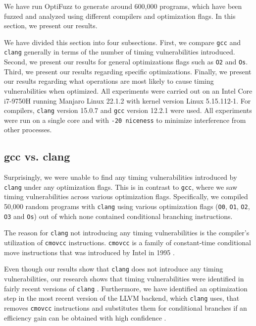 We have run OptiFuzz to generate around 600,000 programs, which have been fuzzed and analyzed using different compilers and optimization flags.
In this section, we present our results.

We have divided this section into four subsections.
First, we compare \texttt{gcc} and \texttt{clang} generally in terms of the number of timing vulnerabilities introduced.
Second, we present our results for general optimizations flags such as \texttt{O2} and \texttt{Os}.
Third, we present our results regarding specific optimizations.
Finally, we present our results regarding what operations are most likely to cause timing vulnerabilities when optimized.
All experiments were carried out on an Intel Core i7-9750H running Manjaro Linux 22.1.2 with kernel version Linux 5.15.112-1. 
For compilers, \texttt{clang} version 15.0.7 and \texttt{gcc} version 12.2.1 were used.
All experiments were run on a single core and with \texttt{-20 niceness} to minimize interference from other processes.

\subsection{gcc vs. clang}
\label{sec:gcc-vs-clang}
Surprisingly, we were unable to find any timing vulnerabilities introduced by \texttt{clang} under any optimization flags.
This is in contrast to \texttt{gcc}, where we saw timing vulnerabilities across various optimization flags.
Specifically, we compiled 50,000 random programs with \texttt{clang} using various optimization flags (\texttt{O0}, \texttt{O1}, \texttt{O2}, \texttt{O3} and \texttt{Os}) out of which none contained conditional branching instructions.

The reason for \texttt{clang} not introducing any timing vulnerabilities is the compiler's utilization of \texttt{cmovcc} instructions. 
\texttt{cmovcc} is a family of constant-time conditional move instructions \citep{cmov-is-constant-time} that was introduced by Intel in 1995 \citep{cmov-from-1995}. 

Even though our results show that \texttt{clang} does not introduce any timing vulnerabilities, our research shows that timing vulnerabilities were identified in fairly recent versions of \texttt{clang} \citep{fact,what-you-c}. 
Furthermore, we have identified an optimization step in the most recent version of the LLVM backend, which \texttt{clang} uses, that removes \texttt{cmovcc} instructions and substitutes them for conditional branches if an efficiency gain can be obtained with high confidence \citep{llvm-optimizing-away-cmov}.

